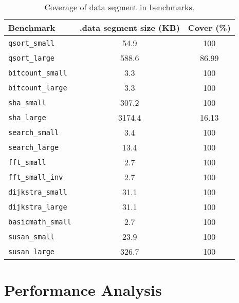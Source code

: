 \begin{table}[t]
	\center
	\caption{Coverage of data segment in benchmarks.}
	\label{tab:benchmarks}
	\footnotesize
	\begin{tabular}{|l|c|c|}
		\hline
			Benchmark & .data segment size (KB) & Cover (\%)\\ 
		\hline
		\hline
			\texttt{qsort\_small}		&	54.9	&	100		\\
			\texttt{qsort\_large}		&	588.6	&	86.99	\\
			\texttt{bitcount\_small}	&	3.3		&	100		\\
			\texttt{bitcount\_large}	&	3.3		&	100		\\
			\texttt{sha\_small}			&	307.2	&	100		\\
			\texttt{sha\_large}			&	3174.4	&	16.13	\\
			\texttt{search\_small}		&	3.4		&	100		\\
			\texttt{search\_large}		&	13.4	&	100		\\
			\texttt{fft\_small}			&	2.7		&	100		\\
			\texttt{fft\_small\_inv}	&	2.7		&	100		\\
			\texttt{dijkstra\_small}	&	31.1	&	100		\\
			\texttt{dijkstra\_large}	&	31.1	&	100		\\
			\texttt{basicmath\_small}	&	2.7		&	100		\\
			\texttt{susan\_small}		&	23.9	&	100		\\
			\texttt{susan\_large}		&	326.7	&	100		\\
		\hline
	\end{tabular}
\end{table}

\section{Performance Analysis}
\label{subsec:Performance-Analysis}


